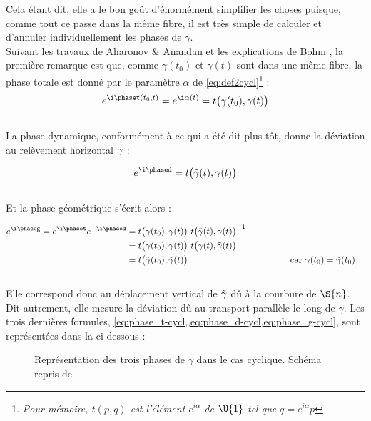 Cela étant dit, elle a le bon goût d'énormément simplifier les choses puisque, comme tout ce passe dans la même fibre, il est très simple de calculer et d'annuler individuellement les phases de $\gamma$. 
\\
Suivant les travaux de Aharonov \& Anandan \cite{aharonov_phase_1987} et les explications de Bohm \cite{bohm_geometric_2003}, la première remarque est que, comme $\gamma(t_0)$ et $\gamma(t)$ sont dans une même fibre, la phase totale est donné par le paramètre $\alpha$ de \eqref{eq:def2cycl}\footnote{\itshape 
Pour mémoire, $t(p,q)$ est l'élément $e^{i\alpha}$ de $\U{1}$ tel que $q = e^{i\alpha}p$} :
\begin{equation}\label{eq:phase_t-cycl}
e^{\i \phaset(t_0,t)} = e^{\i \alpha(t)} = t\big( \gamma(t_0), \gamma(t) \big)
\end{equation}
\\
La phase dynamique, conformément à ce qui a été dit plus tôt, donne la déviation au relèvement horizontal $\Tilde{\gamma}$ :\par
\begin{equation}\label{eq:phase_d-cycl}
e^{\i \phased}= t\big( \Tilde{\gamma}(t), \gamma(t) \big)
\end{equation}
\\
Et la phase géométrique s'écrit alors :\par
\begin{equation}\label{eq:phase_g-cycl}
\begin{aligned}
	e^{\i \phaseg}= e^{\i \phaset} e^{-\i \phased} &= t\big( \gamma(t_0), \gamma(t) \big)\ t\big( \Tilde{\gamma}(t), \gamma(t) \big)^{-1} \\
	&= t\big( \gamma(t_0), \gamma(t) \big)\ t\big( \gamma(t), \Tilde{\gamma}(t) \big) \\
	&= t\big( \Tilde{\gamma}(t_0), \Tilde{\gamma}(t) \big)  &  
	&&  &&  &&  && \text{car }\gamma(t_0) &= \Tilde{\gamma}(t_0)
\end{aligned}
\end{equation}
\\
Elle correspond donc au déplacement vertical de $\Tilde{\gamma}$ dû à la courbure de $\S{n}$. Dit autrement, elle mesure la déviation dû au transport parallèle le long de $\gamma$. Les trois dernières formules, \cref{eq:phase_t-cycl,,eq:phase_d-cycl,eq:phase_g-cycl}, sont représentées dans la  ci-dessous : 
\\

\begin{figure}[h]

\caption[Représentation des trois phases de $\gamma$ dans le cas pseudo-cyclique]{Représentation des trois phases de $\gamma$ dans le cas cyclique. Schéma repris de \cite[fig. 4.1]{bohm_geometric_2003}}
\label{fig:phases-cycl}
\end{figure}

